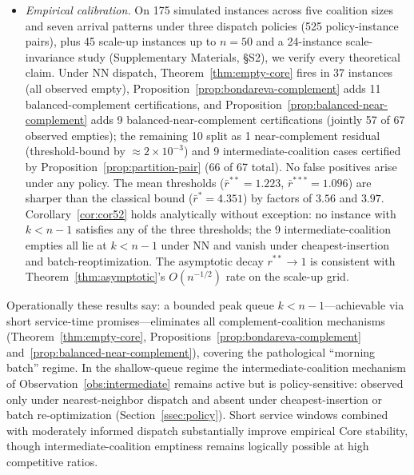\documentclass[11pt]{article}
\theoremstyle{plain}
\theoremstyle{definition}
\theoremstyle{remark}
\begin{document}
\begin{itemize}[leftmargin=1.5em]
\item[\textbf{C4.}] \emph{Empirical calibration.} On 175 simulated instances across five coalition sizes and seven arrival patterns under three dispatch policies (525 policy-instance pairs), plus 45 scale-up instances up to $n=50$ and a 24-instance scale-invariance study (Supplementary Materials, \S S2), we verify every theoretical claim. Under NN dispatch, Theorem~\ref{thm:empty-core} fires in 37 instances (all observed empty), Proposition~\ref{prop:bondareva-complement} adds 11 balanced-complement certifications, and Proposition~\ref{prop:balanced-near-complement} adds 9 balanced-near-complement certifications (jointly 57 of 67 observed empties); the remaining 10 split as 1 near-complement residual (threshold-bound by $\approx 2\times 10^{-3}$) and 9 intermediate-coalition cases certified by Proposition~\ref{prop:partition-pair} (66 of 67 total). No false positives arise under any policy. The mean thresholds ($\bar r^{\ast\ast}=1.223$, $\bar r^{\ast\ast\ast}=1.096$) are sharper than the classical bound ($\bar r^{\ast}=4.351$) by factors of $3.56$ and $3.97$. Corollary~\ref{cor:cor52} holds analytically without exception: no instance with $k<n-1$ satisfies any of the three thresholds; the 9 intermediate-coalition empties all lie at $k<n-1$ under NN and vanish under cheapest-insertion and batch-reoptimization. The asymptotic decay $r^{\ast\ast}\to 1$ is consistent with Theorem~\ref{thm:asymptotic}'s $O(n^{-1/2})$ rate on the scale-up grid.
\end{itemize}

Operationally these results say: a bounded peak queue $k<n-1$---achievable via short service-time promises---eliminates all complement-coalition mechanisms (Theorem~\ref{thm:empty-core}, Propositions~\ref{prop:bondareva-complement} and~\ref{prop:balanced-near-complement}), covering the pathological ``morning batch'' regime. In the shallow-queue regime the intermediate-coalition mechanism of Observation~\ref{obs:intermediate} remains active but is policy-sensitive: observed only under nearest-neighbor dispatch and absent under cheapest-insertion or batch re-optimization (Section~\ref{ssec:policy}). Short service windows combined with moderately informed dispatch substantially improve empirical Core stability, though intermediate-coalition emptiness remains logically possible at high competitive ratios.
\end{document}
